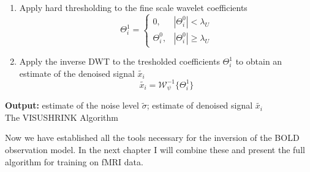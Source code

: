 \begin{algorithm}[htb]
\begin{enumerate}
        \item Apply hard thresholding to the fine scale wavelet coefficients
        \begin{equation}
            \Theta_i^1 = \begin{cases}
                0, & |\Theta_i^0| < \lambda_U \\
                \Theta_i^0, & |\Theta_i^0| \geq \lambda_U
            \end{cases}
        \end{equation}
        \item Apply the inverse DWT to the tresholded coefficients $\Theta_i^1$ to obtain an estimate of the denoised signal $\tilde{x_i}$
        \begin{equation}
            \tilde{x_i} = \mathscr{W}_{\psi}^{-1} \{\Theta_i^1 \}
        \end{equation}
    \end{enumerate}
    \hspace*{\algorithmicindent} \textbf{Output:} estimate of the noise level $\tilde{\sigma}$; estimate of denoised signal $\tilde{x_i}$ \\ 
    \caption{The VISUSHRINK Algorithm}
    \label{algo:visushrink}
\end{algorithm}

Now we have established all the tools necessary for the inversion of the BOLD observation model. In the next chapter I will combine these and present the full algorithm
for training on fMRI data.